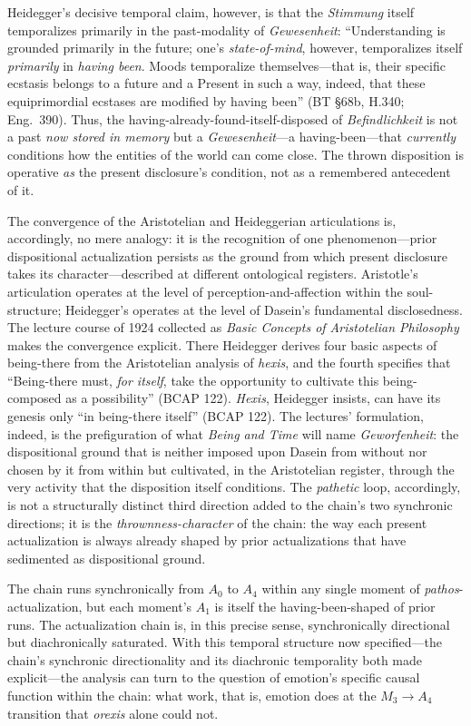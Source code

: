 Heidegger's decisive temporal claim, however, is that the \textit{Stimmung} itself temporalizes primarily in the past-modality of \textit{Gewesenheit}: ``Understanding is grounded primarily in the future; one's \textit{state-of-mind}, however, temporalizes itself \textit{primarily} in \textit{having been}. Moods temporalize themselves---that is, their specific ecstasis belongs to a future and a Present in such a way, indeed, that these equiprimordial ecstases are modified by having been'' (BT \S68b, H.340; Eng.~390). Thus, the having-already-found-itself-disposed of \textit{Befindlichkeit} is not a past \textit{now stored in memory} but a \textit{Gewesenheit}---a having-been---that \textit{currently} conditions how the entities of the world can come close. The thrown disposition is operative \textit{as} the present disclosure's condition, not as a remembered antecedent of it.

The convergence of the Aristotelian and Heideggerian articulations is, accordingly, no mere analogy: it is the recognition of one phenomenon---prior dispositional actualization persists as the ground from which present disclosure takes its character---described at different ontological registers. Aristotle's articulation operates at the level of perception-and-affection within the soul-structure; Heidegger's operates at the level of Dasein's fundamental disclosedness. The lecture course of 1924 collected as \textit{Basic Concepts of Aristotelian Philosophy} makes the convergence explicit. There Heidegger derives four basic aspects of being-there from the Aristotelian analysis of \textit{hexis}, and the fourth specifies that ``Being-there must, \textit{for itself}, take the opportunity to cultivate this being-composed as a possibility'' (BCAP 122). \textit{Hexis}, Heidegger insists, can have its genesis only ``in being-there itself'' (BCAP 122). The lectures' formulation, indeed, is the prefiguration of what \textit{Being and Time} will name \textit{Geworfenheit}: the dispositional ground that is neither imposed upon Dasein from without nor chosen by it from within but cultivated, in the Aristotelian register, through the very activity that the disposition itself conditions. The \textit{pathetic} loop, accordingly, is not a structurally distinct third direction added to the chain's two synchronic directions; it is the \textit{thrownness-character} of the chain: the way each present actualization is always already shaped by prior actualizations that have sedimented as dispositional ground.

The chain runs synchronically from $A_0$ to $A_4$ within any single moment of \textit{pathos}-actualization, but each moment's $A_1$ is itself the having-been-shaped of prior runs. The actualization chain is, in this precise sense, synchronically directional but diachronically saturated. With this temporal structure now specified---the chain's synchronic directionality and its diachronic temporality both made explicit---the analysis can turn to the question of emotion's specific causal function within the chain: what work, that is, emotion does at the $M_3 \rightarrow A_4$ transition that \textit{orexis} alone could not.

